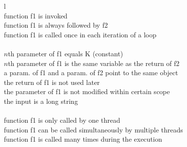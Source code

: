 \begin{table}[h!]
\scriptsize
\centering
{
\begin{tabular}{l}
\toprule
{}\\
  \midrule
    function f1 is invoked	\\
    function f1 is always followed by f2	\\
    function f1 is called once in each iteration of a loop\\
\midrule
{}\\
\midrule
     $n$th parameter of f1 equals K (constant) \\
     $n$th parameter of f1 is the same variable as the return of f2\\
     a param. of f1 and a param. of f2 point to the same object\\
     the return of f1 is not used later	\\
     the parameter of f1 is not modified within certain scope\\
     the input is a long string \\
\midrule
{}\\
\midrule
     function f1 is only called by one thread \\
     function f1 can be called simultaneously by multiple threads \\
     function f1 is called many times during the execution \\
\bottomrule
\end{tabular}
}
\caption{Typical conditions in function rules.}
\label{tab:4_rule}
\end{table}
